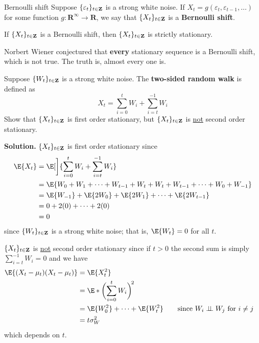 \begin{Definition}{Bernoulli shift}{}
    Suppose $ \{\varepsilon_t\}_{t\in\mathbf{Z}} $ is a
    strong white noise. If $ X_t=g(\varepsilon_t,\varepsilon_{t-1},\ldots) $
    for some function $ g:\mathbf{R}^\infty \to \mathbf{R} $, we say that
    $ \{X_t\}_{t\in\mathbf{Z}} $ is a \textbf{Bernoulli shift}.
\end{Definition}
\begin{Theorem}{}{}
    If $ \{X_t\}_{t\in\mathbf{Z}} $ is a Bernoulli shift, then
    $ \{X_t\}_{t\in\mathbf{Z}} $ is strictly stationary.
\end{Theorem}
\begin{Remark}{}{}
    Norbert Wiener conjectured that \textbf{every} stationary
    sequence is a Bernoulli shift, which is not true. The truth is,
    almost every one is.
\end{Remark}
\begin{Exercise}{}{}
    Suppose $ \{W_t\}_{t\in\mathbf{Z}} $ is a strong white noise.
    The \textbf{two-sided random walk} is defined as
    \[ X_t=\sum_{i=0}^{t} W_i+\sum_{i=t}^{-1} W_i  \]
    Show that $ \{X_t\}_{t\in\mathbf{Z}} $ is first order stationary,
    but $ \{X_t\}_{t\in\mathbf{Z}} $ is \underline{not} second order stationary.

    \textbf{Solution.} $ \{X_t\}_{t\in\mathbf{Z}} $ is first order stationary
    since
    \begin{align*}
        \E{X_t}
         & =\E[\bigg]{\sum_{i=0}^{t}W_i+\sum_{i=t}^{-1} W_i}                   \\
         & =\E{W_0+W_1+\cdots+W_{t-1}+W_{t}+W_{t}+W_{t-1}+\cdots+W_{0}+W_{-1}} \\
         & =\E{W_{-1}}+\E{2W_0}+\E{2W_1}+\cdots+\E{2W_{t-1}}                   \\
         & =0+2(0)+\cdots+2(0)                                                 \\
         & =0
    \end{align*}
    since $ \{W_t\}_{t\in\mathbf{Z}} $ is a strong white noise; that is,
    $ \E{W_t}=0 $ for all $ t $.

    $ \{X_t\}_{t\in\mathbf{Z}} $ is \underline{not} second order stationary
    since if $ t>0 $ the second sum is simply $ \sum_{i=t}^{-1} W_i=0 $ and we have
    \begin{align*}
        \E{(X_t-\mu_t)(X_t-\mu_t)}
         & =\E{X_t^2}                                                                                           \\
         & =\E*{\biggl(\sum_{i=0}^{t} W_i\biggr)^{\!2}}                                                         \\
         & =\E{W_0^2}+\cdots+\E{W_t^2}                  & \quad & \text{since $ W_i\indep W_j $ for $ i\ne j $} \\
         & =t\sigma_W^2
    \end{align*}
    which depends on $ t $.
\end{Exercise}
